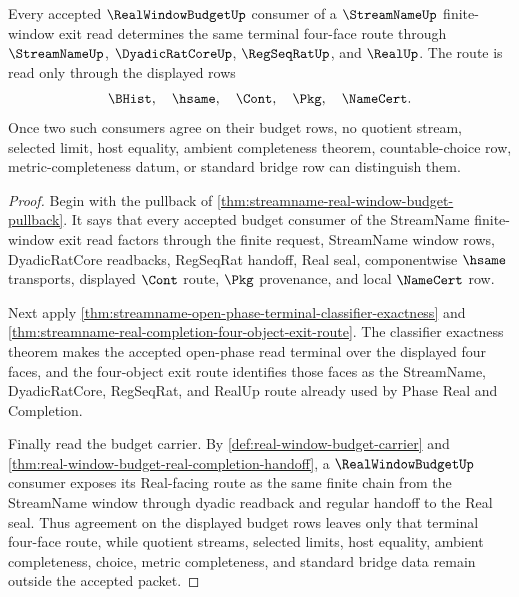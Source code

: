 \begin{theorem}
\label{thm:streamname-open-phase-budget-consumer-terminality}
Every accepted $\RealWindowBudgetUp$ consumer of a $\StreamNameUp$ finite-window exit read determines the same terminal four-face route through $\StreamNameUp$, $\DyadicRatCoreUp$, $\RegSeqRatUp$, and $\RealUp$. The route is read only through the displayed rows
$$
\BHist,\quad \hsame,\quad \Cont,\quad \Pkg,\quad \NameCert.
$$
Once two such consumers agree on their budget rows, no quotient stream, selected limit, host equality, ambient completeness theorem, countable-choice row, metric-completeness datum, or standard bridge row can distinguish them.
\end{theorem}
\begin{proof}
Begin with the pullback of \autoref{thm:streamname-real-window-budget-pullback}. It says that every accepted budget consumer of the StreamName finite-window exit read factors through the finite request, StreamName window rows, DyadicRatCore readbacks, RegSeqRat handoff, Real seal, componentwise $\hsame$ transports, displayed $\Cont$ route, $\Pkg$ provenance, and local $\NameCert$ row.

Next apply \autoref{thm:streamname-open-phase-terminal-classifier-exactness} and \autoref{thm:streamname-real-completion-four-object-exit-route}. The classifier exactness theorem makes the accepted open-phase read terminal over the displayed four faces, and the four-object exit route identifies those faces as the StreamName, DyadicRatCore, RegSeqRat, and RealUp route already used by Phase Real and Completion.

Finally read the budget carrier. By \autoref{def:real-window-budget-carrier} and \autoref{thm:real-window-budget-real-completion-handoff}, a $\RealWindowBudgetUp$ consumer exposes its Real-facing route as the same finite chain from the StreamName window through dyadic readback and regular handoff to the Real seal. Thus agreement on the displayed budget rows leaves only that terminal four-face route, while quotient streams, selected limits, host equality, ambient completeness, choice, metric completeness, and standard bridge data remain outside the accepted packet.
\end{proof}

